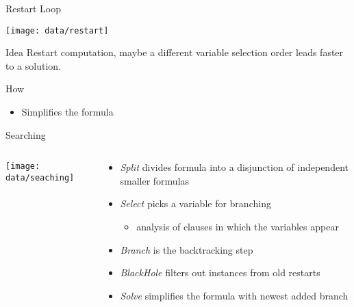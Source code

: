\documentclass[mathserif,serif]{beamer}
\begin{document}
\begin{frame}{Restart Loop}
  \begin{center}
    \texttt{[image: data/restart]}
  \end{center}

  \begin{block}{Idea}
    Restart computation, maybe a different variable selection order
    leads faster to a solution.
  \end{block}

  \begin{block}{How}
    \begin{itemize}
      \item Simplifies the formula
    \end{itemize}
  \end{block}

\end{frame}

\begin{frame}{Searching}
  \begin{columns}[t]
    \begin{column}[T]{0.3\textwidth}
      \centering
      \texttt{[image: data/seaching]}
    \end{column}

    \begin{column}[T]{0.8\textwidth}
      \begin{itemize}
        \item \emph{Split} divides formula into a disjunction of 
        independent smaller formulas
        \item \emph{Select} picks a variable for branching
        \begin{itemize}
          \item analysis of clauses in which the variables appear
        \end{itemize}
        \item \emph{Branch} is the backtracking step
        \item \emph{BlackHole} filters out instances from old restarts
        \item \emph{Solve} simplifies the formula with newest added branch
      \end{itemize}
    \end{column}
  \end{columns}
\end{frame}
\end{document}
